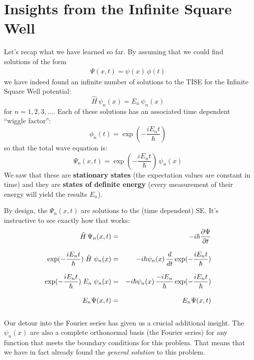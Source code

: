 \documentclass[12pt]{book}
\begin{document}
\section{Insights from the Infinite Square Well}

Let's recap what we have learned so far.  By assuming that we could find solutions of the form
\begin{eqnarray*}
\Psi(x,t) = \psi(x) \, \phi(t)
\end{eqnarray*}
we have indeed found an infinite number of solutions to the TISE for the Infinite Square Well potential:
\begin{equation*}
\hat{H} \, \psi_n(x) = E_n \, \psi_n(x)
\end{equation*}
for $n=1,2,3,\dots$. Each of these solutions has an associated time dependent ``wiggle factor'':
\begin{equation*}
\phi_n(t) = \exp(-\frac{i E_n t}{\hbar})
\end{equation*}
so that the total wave equation is:
\begin{equation*}
\Psi_n(x,t) = \exp(-\frac{i E_n t}{\hbar}) \, \psi_n(x)
\end{equation*}
We saw that these are {\bf stationary states} (the expectation values are constant in time) and they are {\bf states of definite energy} (every measurement of their energy will yield the results $E_n$).

By design, the $\Psi_n(x,t)$ are solutions to the (time dependent) SE.  It's instructive to see exactly how that works:
\begin{eqnarray*}
\hat{H} \, \Psi_n(x,t) &=& -i \hbar \frac{\partial\Psi}{\partial t}\\[8pt]
\exp(-\frac{i E_n t}{\hbar}) \; \hat{H} \; \psi_n(x) &=& -i \hbar \psi_n(x) \, \frac{d}{dt}
\exp(-\frac{i E_n t}{\hbar})\\[8pt]
\exp(-\frac{i E_n t}{\hbar}) \; E_n \; \psi_n(x) &=& -i \hbar \psi_n(x) \, \frac{-iE_n}{\hbar}
\exp(-\frac{i E_n t}{\hbar})\\[8pt]
E_n \Psi(x,t) &=& E_n \Psi(x,t)\\[8pt]
\end{eqnarray*}

Our detour into the Fourier series has given us a crucial additional insight.  The $\psi_n(x)$ are also a complete orthonormal basis (the Fourier series) for any function that meets the boundary conditions for this problem.  That means that we have in fact already found the {\em general solution} to this problem.
\end{document}
